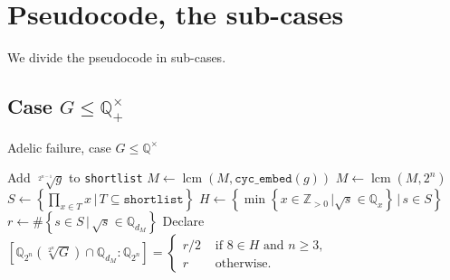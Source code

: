 \documentclass[10pt,a4paper]{article}
\DeclareMathOperator{\lcm}{lcm}
\theoremstyle{definition}
\begin{document}
\section{Pseudocode, the sub-cases}

We divide the pseudocode in sub-cases.

\subsection{Case $G\leq \mathbb{Q}_+^\times$}

\begin{algorithm}
\caption{Adelic failure, case $G\leq \mathbb{Q}^\times$}

\begin{algorithmic}
\State Add $\sqrt[2^{n-1}]{g}$ to \texttt{shortlist}
\State $M\leftarrow\lcm(M,\texttt{cyc\_embed}(g))$
\EndFor
\State
\State $M\leftarrow\lcm(M,2^n)$
\State
{}
\State $S\leftarrow\left\{\prod_{x\in T}x\,|\,T\subseteq\texttt{shortlist}\right\}$
\State $H\leftarrow\left\{\min\left\{x\in\mathbb{Z}_{>0}\,|\sqrt{s}\in \mathbb{Q}_x\right\}\,|\,s\in S\right\}$
\State $r\leftarrow\# \left\{s\in S\,|\, \sqrt{s}\in\mathbb{Q}_{d_M}\right\}$
\State Declare $\left[\mathbb{Q}_{2^n}\left(\sqrt[2^n]{G}\right)\cap \mathbb{Q}_{d_M}:\mathbb{Q}_{2^n}\right]=\begin{cases}
r/2&\text{ if }8\in H\text{ and }n\geq 3,\\
r&\text{ otherwise}.
\end{cases}$
\EndFor
\EndFor
\end{algorithmic}

\end{algorithm}
\pagebreak
\end{document}

